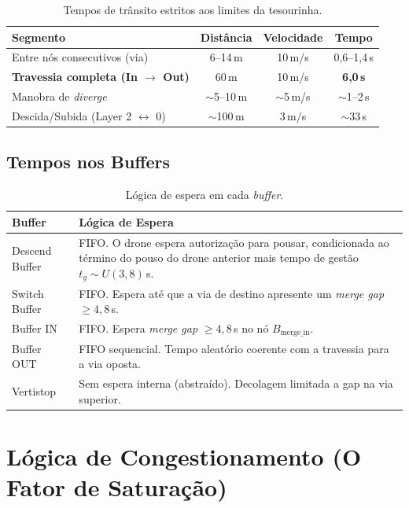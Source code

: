 \documentclass[12pt,a4paper]{article}
\begin{document}
\begin{table}[H]
\centering
\caption{Tempos de trânsito estritos aos limites da tesourinha.}
\label{tab:tempos_transito}
\begin{tabular}{@{}lccc@{}}
\toprule
\textbf{Segmento} & \textbf{Distância} & \textbf{Velocidade} & \textbf{Tempo} \\
\midrule
Entre nós consecutivos (via)     & 6--14\,m     & 10\,m/s            & 0{,}6--1{,}4\,s \\
\textbf{Travessia completa (In $\to$ Out)} & 60\,m & 10\,m/s   & \textbf{6{,}0\,s} \\
Manobra de \textit{diverge}      & $\sim$5--10\,m & $\sim$5\,m/s     & $\sim$1--2\,s \\
Descida/Subida (Layer 2 $\leftrightarrow$ 0) & $\sim$100\,m & 3\,m/s       & $\sim$33\,s \\
\bottomrule
\end{tabular}
\end{table}

\subsection{Tempos nos Buffers}

\begin{table}[H]
\centering
\caption{Lógica de espera em cada \textit{buffer}.}
\label{tab:tempos_buffers}
\begin{tabular}{@{}lp{9cm}@{}}
\toprule
\textbf{Buffer} & \textbf{Lógica de Espera} \\
\midrule
Descend Buffer & FIFO. O drone espera autorização para pousar, condicionada ao término do pouso do drone anterior mais tempo de gestão $t_g \sim U(3, 8)$\,s. \\
Switch Buffer  & FIFO. Espera até que a via de destino apresente um \textit{merge gap} $\geq 4{,}8$\,s. \\
Buffer IN      & FIFO. Espera \textit{merge gap} $\geq 4{,}8$\,s no nó $B_{\text{merge\_in}}$. \\
Buffer OUT     & FIFO sequencial. Tempo aleatório coerente com a travessia para a via oposta. \\
Vertistop      & Sem espera interna (abstraído). Decolagem limitada a gap na via superior. \\
\bottomrule
\end{tabular}
\end{table}

\section{Lógica de Congestionamento (O Fator de Saturação)}
\label{sec:congestionamento}
\end{document}
